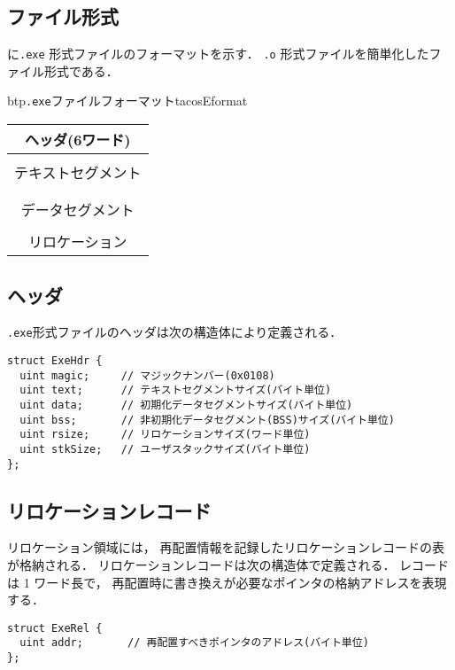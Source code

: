 \subsection{ファイル形式}
に\texttt{.exe} 形式ファイルのフォーマットを示す．
\texttt{.o} 形式ファイルを簡単化したファイル形式である．

\begin{myfig}{btp}{\texttt{.exe}ファイルフォーマット}{tacosEformat}
  \begin{tabular}{|c|} \hline
    ヘッダ(6ワード) \\\hline
    \\
    テキストセグメント \\
    \\\hline
    \\
    データセグメント \\
    \\\hline
    リロケーション \\\hline
  \end{tabular}
\end{myfig}

\subsection{ヘッダ}
\texttt{.exe}形式ファイルのヘッダは次の構造体により定義される．

\begin{lstlisting}[numbers=none,float=htb]
struct ExeHdr {
  uint magic;     // マジックナンバー(0x0108)
  uint text;      // テキストセグメントサイズ(バイト単位)
  uint data;      // 初期化データセグメントサイズ(バイト単位)
  uint bss;       // 非初期化データセグメント(BSS)サイズ(バイト単位)
  uint rsize;     // リロケーションサイズ(ワード単位)
  uint stkSize;   // ユーザスタックサイズ(バイト単位)
};
\end{lstlisting}

\subsection{リロケーションレコード}
リロケーション領域には，
再配置情報を記録したリロケーションレコードの表が格納される．
リロケーションレコードは次の構造体で定義される．
レコードは 1 ワード長で，
再配置時に書き換えが必要なポインタの格納アドレスを表現する．

\begin{lstlisting}[numbers=none,float=htb]
struct ExeRel {
  uint addr;       // 再配置すべきポインタのアドレス(バイト単位)
};
\end{lstlisting}

